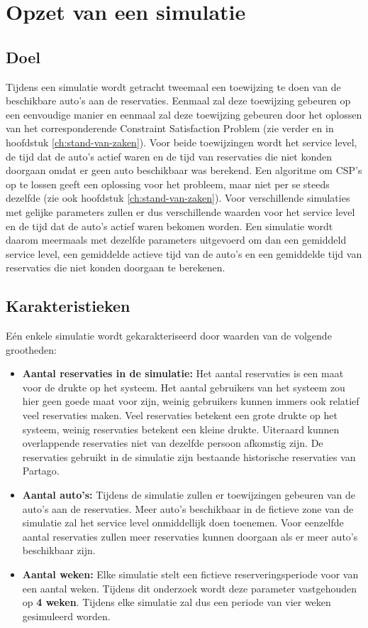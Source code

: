 \section{Opzet van een simulatie} \label{opzet-simulatie}
\subsection{Doel}
Tijdens een simulatie wordt getracht tweemaal een toewijzing te doen van de beschikbare auto's aan de reservaties. Eenmaal zal deze toewijzing gebeuren op een eenvoudige manier en eenmaal zal deze toewijzing gebeuren door het oplossen van het corresponderende Constraint Satisfaction Problem (zie verder en in hoofdstuk \ref{ch:stand-van-zaken}). Voor beide toewijzingen wordt het service level, de tijd dat de auto's actief waren en de tijd van reservaties die niet konden doorgaan omdat er geen auto beschikbaar was berekend. Een algoritme om CSP's op te lossen geeft een oplossing voor het probleem, maar niet per se steeds dezelfde (zie ook hoofdstuk \ref{ch:stand-van-zaken}). Voor verschillende simulaties met gelijke parameters zullen er dus verschillende waarden voor het service level en de tijd dat de auto's actief waren bekomen worden. Een simulatie wordt daarom meermaals met dezelfde parameters uitgevoerd om dan een gemiddeld service level, een gemiddelde actieve tijd van de auto's en een gemiddelde tijd van reservaties die niet konden doorgaan te berekenen.

\subsection{Karakteristieken}
Eén enkele simulatie wordt gekarakteriseerd door waarden van de volgende grootheden:
\begin{itemize}
	\item \textbf{Aantal reservaties in de simulatie:}
	Het aantal reservaties is een maat voor de drukte op het systeem. Het aantal gebruikers van het systeem zou hier geen goede maat voor zijn, weinig gebruikers kunnen immers ook relatief veel reservaties maken. Veel reservaties betekent een grote drukte op het systeem, weinig reservaties betekent een kleine drukte. Uiteraard kunnen overlappende reservaties niet van dezelfde persoon afkomstig zijn. De reservaties gebruikt in de simulatie zijn bestaande historische reservaties van Partago.
	\item \textbf{Aantal auto's:}
	Tijdens de simulatie zullen er toewijzingen gebeuren van de auto's aan de reservaties. Meer auto's beschikbaar in de fictieve zone van de simulatie zal het service level onmiddellijk doen toenemen. Voor eenzelfde aantal reservaties zullen meer reservaties kunnen doorgaan als er meer auto's beschikbaar zijn. 
	\item \textbf{Aantal weken:}
	Elke simulatie stelt een fictieve reserveringsperiode voor van een aantal weken. Tijdens dit onderzoek wordt deze parameter vastgehouden op \textbf{4 weken}. Tijdens elke simulatie zal dus een periode van vier weken gesimuleerd worden. 
\end{itemize} 

